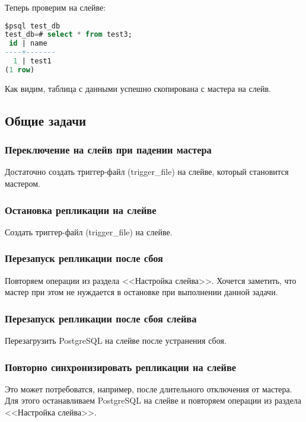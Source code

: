 Теперь проверим на слейве:
\begin{lstlisting}[language=SQL,label=lst:streaming18,caption=Выполняем на слейве]
$psql test_db
test_db=# select * from test3;
 id | name  
----+-------
  1 | test1
(1 row)
\end{lstlisting}

Как видим, таблица с данными успешно скопирована с мастера на слейв. 

\subsection{Общие задачи}
\subsubsection{Переключение на слейв при падении мастера}
Достаточно создать триггер-файл (trigger\_file) на слейве, который становится мастером.

\subsubsection{Остановка репликации на слейве}
Создать триггер-файл (trigger\_file) на слейве.

\subsubsection{Перезапуск репликации после сбоя}
Повторяем операции из раздела <<Настройка слейва>>. Хочется заметить, 
что мастер при этом не нуждается в остановке при выполнении данной задачи.

\subsubsection{Перезапуск репликации после сбоя слейва}
Перезагрузить PostgreSQL на слейве после устранения сбоя.

\subsubsection{Повторно синхронизировать репликации на слейве}
Это может потребоватся, например, после длительного отключения от мастера. 
Для этого останавливаем PostgreSQL на слейве и повторяем операции из раздела <<Настройка слейва>>.